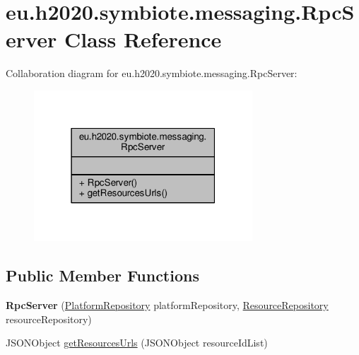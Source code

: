 \hypertarget{classeu_1_1h2020_1_1symbiote_1_1messaging_1_1RpcServer}{}\section{eu.\+h2020.\+symbiote.\+messaging.\+Rpc\+Server Class Reference}
\label{classeu_1_1h2020_1_1symbiote_1_1messaging_1_1RpcServer}


Collaboration diagram for eu.\+h2020.\+symbiote.\+messaging.\+Rpc\+Server\+:
\nopagebreak
\begin{figure}[H]
\begin{center}
\leavevmode
\includegraphics[width=232pt]{classeu_1_1h2020_1_1symbiote_1_1messaging_1_1RpcServer__coll__graph}
\end{center}
\end{figure}
\subsection*{Public Member Functions}
\begin{DoxyCompactItemize}
\item 
\mbox{\label{classeu_1_1h2020_1_1symbiote_1_1messaging_1_1RpcServer_a575b7ffdc6def407b2e701f00449bc5a}} 
{\bfseries Rpc\+Server} (\hyperlink{interfaceeu_1_1h2020_1_1symbiote_1_1repository_1_1PlatformRepository}{Platform\+Repository} platform\+Repository, \hyperlink{interfaceeu_1_1h2020_1_1symbiote_1_1repository_1_1ResourceRepository}{Resource\+Repository} resource\+Repository)
\item 
J\+S\+O\+N\+Object \hyperlink{classeu_1_1h2020_1_1symbiote_1_1messaging_1_1RpcServer_a3f4dbd0b54f371c2375215b3c13dff81}{get\+Resources\+Urls} (J\+S\+O\+N\+Object resource\+Id\+List)
\end{DoxyCompactItemize}


